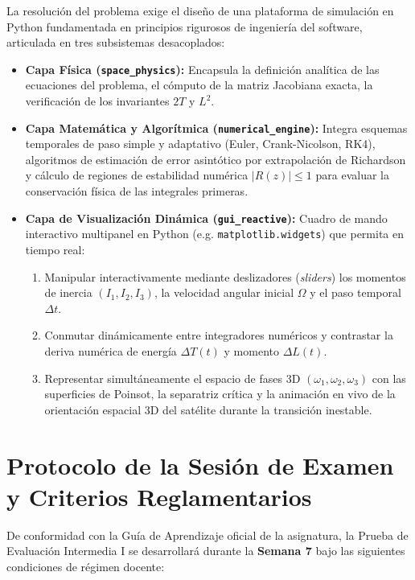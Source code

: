 \documentclass[11pt, a4paper]{article}
\begin{document}
La resolución del problema exige el diseño de una plataforma de simulación en Python 
fundamentada en principios rigurosos de ingeniería del software, 
articulada en tres subsistemas desacoplados:
\begin{itemize}[leftmargin=*]
    \item \textbf{Capa Física (\texttt{space\_physics}):} Encapsula la definición analítica de 
	las ecuaciones del problema, el cómputo de la matriz Jacobiana exacta, 
	la verificación de los invariantes $2T$ y $L^2$.
	 \item \textbf{Capa Matemática y Algorítmica (\texttt{numerical\_engine}):} Integra esquemas
	  temporales de paso simple y adaptativo (Euler, Crank-Nicolson, RK4), 
	  algoritmos de estimación de error asintótico por extrapolación de Richardson y 
	  cálculo de regiones de estabilidad numérica $|R(z)| \le 1$ 
	  para evaluar la conservación física de las integrales primeras.
    \item \textbf{Capa de Visualización Dinámica (\texttt{gui\_reactive}):} 
	Cuadro de mando interactivo multipanel en Python (e.g. \texttt{matplotlib.widgets}) que permita en tiempo real:
    \begin{enumerate}
        \item Manipular interactivamente mediante deslizadores (\textit{sliders}) los momentos de inercia $(I_1, I_2, I_3)$, la velocidad angular inicial $\Omega$ y el paso temporal $\Delta t$.
        \item Conmutar dinámicamente entre integradores numéricos y contrastar la deriva numérica de energía $\Delta T(t)$ y momento $\Delta L(t)$.
        \item Representar simultáneamente el espacio de fases 3D $(\omega_1, \omega_2, \omega_3)$ con las superficies de Poinsot, la separatriz crítica y la animación en vivo de la orientación espacial 3D del satélite durante la transición inestable.
    \end{enumerate}
\end{itemize}

\section{Protocolo de la Sesión de Examen y Criterios Reglamentarios}

De conformidad con la Guía de Aprendizaje oficial de la asignatura, la Prueba de Evaluación Intermedia I se desarrollará durante la \textbf{Semana 7} bajo las siguientes condiciones de régimen docente:
\end{document}
